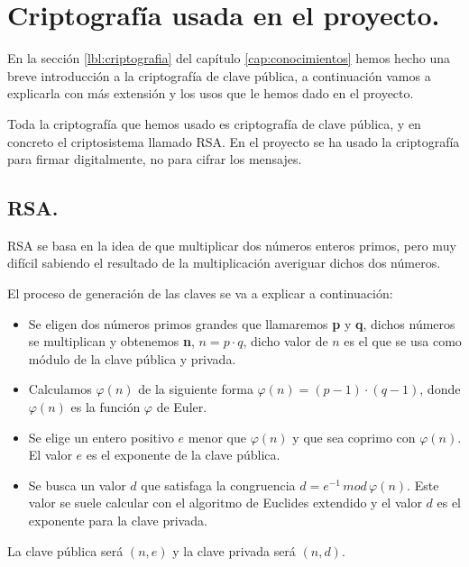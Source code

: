 \chapter{Criptografía usada en el proyecto.}\label{cap:criptografia}

En la sección \ref{lbl:criptografia} del capítulo \ref{cap:conocimientos} hemos hecho una breve introducción a la criptografía de clave pública, a continuación vamos a explicarla con más extensión y los usos que le hemos dado en el proyecto.

Toda la criptografía que hemos usado es criptografía de clave pública, y en concreto el criptosistema llamado RSA. En el proyecto se ha usado la criptografía para firmar digitalmente, no para cifrar los mensajes.

\section{RSA.}

RSA se basa en la idea de que multiplicar dos números enteros primos, pero muy difícil sabiendo el resultado de la multiplicación averiguar dichos dos números.

El proceso de generación de las claves se va a explicar a continuación:
\begin{itemize}

	\item Se eligen dos números primos grandes que llamaremos \textbf{p} y \textbf{q}, dichos números se multiplican y obtenemos \textbf{n}, $n = p \cdot q$, dicho valor de $n$ es el que se usa como módulo de la clave pública y privada. 

	\item Calculamos $\varphi(n)$ de la siguiente forma $\varphi(n)=(p-1)\cdot(q-1)$, donde $\varphi(n)$ es la función $\varphi$ de Euler.

	\item Se elige un entero positivo $e$ menor que $\varphi(n)$ y que sea coprimo con $\varphi(n)$. El valor $e$ es el exponente de la clave pública.
	
	\item Se busca un valor $d$ que satisfaga la congruencia $d=e^{-1}\,mod\,\varphi(n)$. Este valor se suele calcular con el algoritmo de Euclides extendido y el valor $d$ es el exponente para la clave privada. 
\end{itemize}

La clave pública será $(n,e)$ y la clave privada será $(n,d)$.

